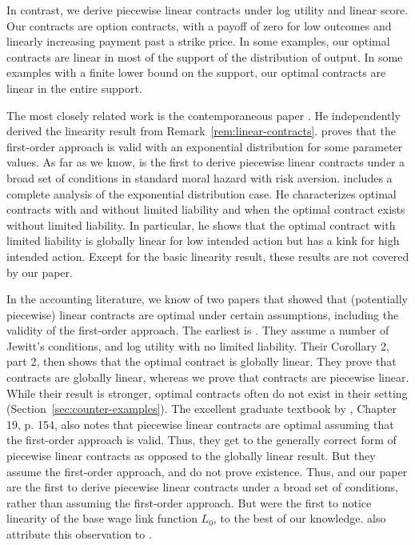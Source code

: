 In contrast, we derive piecewise linear contracts under log utility and linear score. Our contracts are option contracts, with a payoff of zero for low outcomes and linearly increasing payment past a strike price. In some examples, our optimal contracts are linear in most of the support of the distribution of output. In some examples with a finite lower bound on the support, our optimal contracts are linear in the entire support.

The most closely related work is the contemporaneous paper \textcite{opp2025moral}. He independently derived the linearity result from Remark~\ref{rem:linear-contracts}. \textcite{opp2025moral} proves that the first-order approach is valid with an exponential distribution for some parameter values. As far as we know, \textcite{opp2025moral} is the first to derive piecewise linear contracts under a broad set of conditions in standard moral hazard with risk aversion. \textcite{opp2025moral} includes a complete analysis of the exponential distribution case. He characterizes optimal contracts with and without limited liability and when the optimal contract exists without limited liability. In particular, he shows that the optimal contract with limited liability is globally linear for low intended action but has a kink for high intended action. Except for the basic linearity result, these results are not covered by our paper.

In the accounting literature, we know of two papers that showed that (potentially piecewise) linear contracts are optimal under certain assumptions, including the validity of the first-order approach. The earliest is \textcite{hemmer1999introducing}. They assume a number of Jewitt's conditions, and log utility with no limited liability. Their Corollary 2, part 2, then shows that the optimal contract is globally linear. They prove that contracts are globally linear, whereas we prove that contracts are piecewise linear. While their result is stronger, optimal contracts often do not exist in their setting (Section~\ref{sec:counter-examples}). The excellent graduate textbook by \textcite{christensen2005economics}, Chapter 19, p. 154, also notes that piecewise linear contracts are optimal assuming that the first-order approach is valid. Thus, they get to the generally correct form of piecewise linear contracts as opposed to the globally linear result. But they assume the first-order approach, and do not prove existence. Thus, \textcite{opp2025moral} and our paper are the first to derive piecewise linear contracts under a broad set of conditions, rather than assuming the first-order approach. But \textcite{hemmer1999introducing} were the first to notice linearity of the base wage link function $L_0$, to the best of our knowledge. \textcite{chaigneau2015changes,chaigneau2017prudence} also attribute this observation to \textcite{hemmer1999introducing}.


